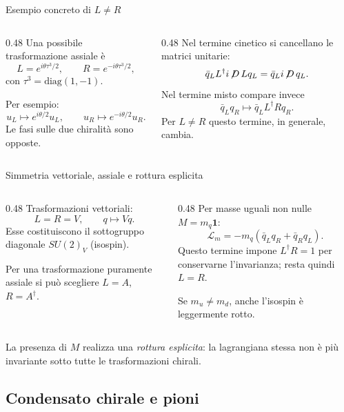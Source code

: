 \begin{frame}{Esempio concreto di $L\neq R$}
\small
\begin{columns}[T,onlytextwidth]
\begin{column}{0.48\textwidth}
Una possibile trasformazione assiale è
\[
 L=e^{i\theta\tau^3/2},\qquad
 R=e^{-i\theta\tau^3/2},
\]
con $\tau^3=\mathrm{diag}(1,-1)$.

Per esempio:
\[
 u_L\mapsto e^{i\theta/2}u_L,
 \qquad u_R\mapsto e^{-i\theta/2}u_R.
\]
Le fasi sulle due chiralità sono opposte.
\end{column}
\begin{column}{0.48\textwidth}
Nel termine cinetico si cancellano le matrici unitarie:
\[
 \bar q_L L^\dagger i\!\not\!D\,Lq_L
 =\bar q_L i\!\not\!D\,q_L.
\]
Nel termine misto compare invece
\[
 \bar q_Lq_R\mapsto
 \bar q_LL^\dagger Rq_R.
\]
Per $L\neq R$ questo termine, in generale, cambia.
\end{column}
\end{columns}
\end{frame}

\begin{frame}{Simmetria vettoriale, assiale e rottura esplicita}
\small
\begin{columns}[T,onlytextwidth]
\begin{column}{0.48\textwidth}
Trasformazioni vettoriali:
\[
 L=R=V,\qquad q\mapsto Vq.
\]
Esse costituiscono il sottogruppo diagonale $SU(2)_V$ (isospin).

Per una trasformazione puramente assiale si può scegliere $L=A$, $R=A^\dagger$.
\end{column}
\begin{column}{0.48\textwidth}
Per masse uguali non nulle $M=m_q\mathbf1$:
\[
 \mathcal L_m=-m_q(\bar q_Lq_R+\bar q_Rq_L).
\]
Questo termine impone $L^\dagger R=1$ per conservarne l'invarianza; resta quindi $L=R$.

Se $m_u\neq m_d$, anche l'isospin è leggermente rotto.
\end{column}
\end{columns}
\medskip
La presenza di $M$ realizza una \emph{rottura esplicita}: la lagrangiana stessa non è più invariante sotto tutte le trasformazioni chirali.
\end{frame}

\subsection{Condensato chirale e pioni}

